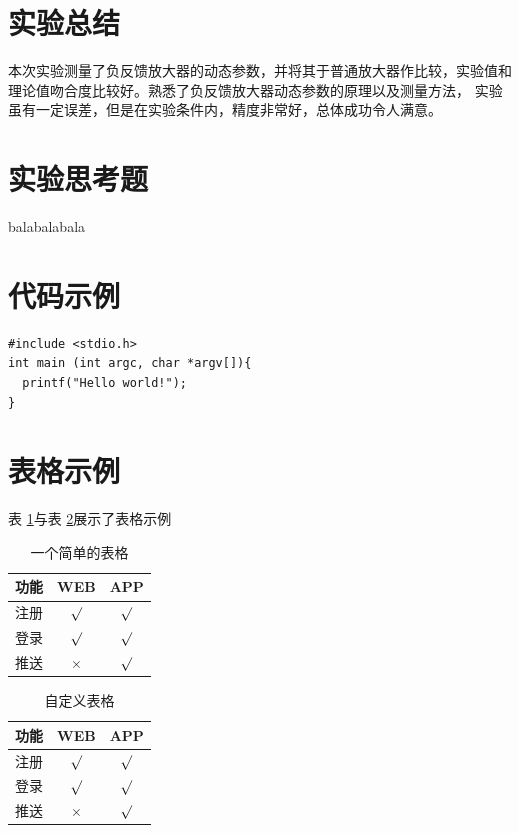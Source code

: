 \documentclass[a4paper,11pt,UTF8]{ctexart}
\begin{document}
\section{实验总结}
本次实验测量了负反馈放大器的动态参数，并将其于普通放大器作比较，实验值和理论值吻合度比较好。熟悉了负反馈放大器动态参数的原理以及测量方法，
实验虽有一定误差，但是在实验条件内，精度非常好，总体成功令人满意。
\section{实验思考题}
balabalabala

\begin{appendix}

\section{代码示例}

\begin{lstlisting}[caption={一段C代码},captionpos=b]
#include <stdio.h>
int main (int argc, char *argv[]){
  printf("Hello world!");
}
\end{lstlisting}

\section{表格示例}
表 \ref{tab:tab1}与表 \ref{tab:tab2}展示了表格示例
\begin{table}[!h!tbp]
\caption{一个简单的表格}\label{tab:tab1}
  \centering
  \begin{tabular}{|l|c|c|}
	\hline
	功能          &WEB         &APP         \\ \hline
	注册          &$\surd$     &$\surd$     \\ \hline
	登录          &$\surd$     &$\surd$     \\ \hline
	推送          &$\times$    &$\surd$     \\ \hline
\end{tabular}
\end{table}

\begin{table}[!h!tbp]
\caption{自定义表格}\label{tab:tab2}
  \centering
\begin{tabular*}{0.75\textwidth}{@{\extracolsep{\fill}}lcc}
    \toprule
    功能          &WEB         &APP         \\
    \midrule
    注册          &$\surd$     &$\surd$     \\
    登录          &$\surd$     &$\surd$     \\
    推送          &$\times$    &$\surd$     \\
    \bottomrule
\end{tabular*}
\end{table}



\end{appendix}
\end{document}
